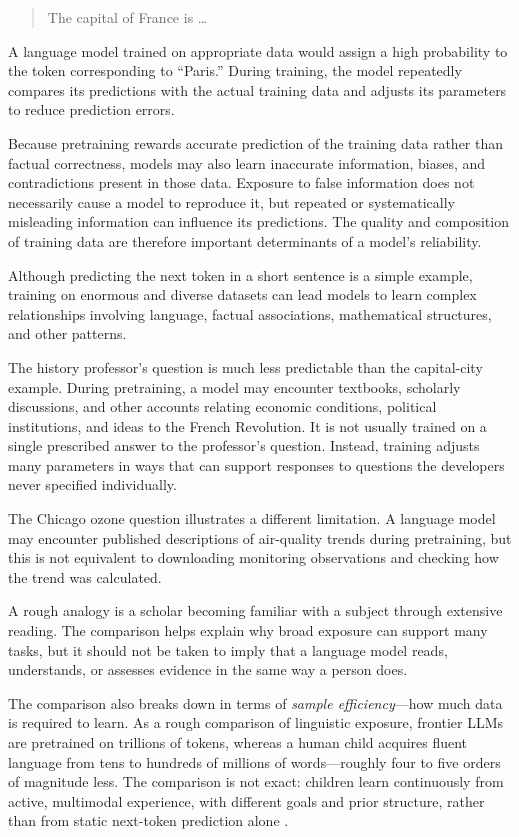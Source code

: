 \documentclass[11pt]{article}
\begin{document}
\begin{quote}
The capital of France is \ldots
\end{quote}

A language model trained on appropriate data would assign
a high probability to the token corresponding to
``Paris.'' During training, the model repeatedly compares
its predictions with the actual training data and adjusts
its parameters to reduce prediction errors.

Because pretraining rewards accurate prediction of the training data rather than factual correctness, models may also learn inaccurate information, biases, and contradictions present in those data. Exposure to false information does not necessarily cause a model to reproduce it, but repeated or systematically misleading information can influence its predictions. The quality and composition of training data are therefore important determinants of a model's reliability.

Although predicting the next token in a short sentence is a simple example, training on enormous and diverse datasets can lead models to learn complex relationships involving language, factual associations, mathematical structures, and other patterns.

The history professor's question is much less predictable
than the capital-city example. During pretraining, a model
may encounter textbooks, scholarly discussions, and other
accounts relating economic conditions, political institutions,
and ideas to the French Revolution. It is not usually trained
on a single prescribed answer to the professor's question.
Instead, training adjusts many parameters in ways that can
support responses to questions the developers never specified
individually.

The Chicago ozone question illustrates a different limitation.
A language model may encounter published descriptions of air-quality
trends during pretraining, but this is not equivalent to downloading
monitoring observations and checking how the trend was calculated.

A rough analogy is a scholar becoming familiar with a subject
through extensive reading. The comparison helps explain why
broad exposure can support many tasks, but it should not be
taken to imply that a language model reads, understands, or
assesses evidence in the same way a person does.

The comparison also breaks down in terms of \emph{sample efficiency}---how much data is required to learn. As a rough comparison of linguistic exposure, frontier LLMs are pretrained on trillions of tokens, whereas a human child acquires fluent language from tens to hundreds of millions of words---roughly four to five orders of magnitude less. The comparison is not exact: children learn continuously from active, multimodal experience, with different goals and prior structure, rather than from static next-token prediction alone \citep{Frank2023DataGap,Warstadt2023BabyLM,Patel2026DataBlackHole}.
\end{document}
